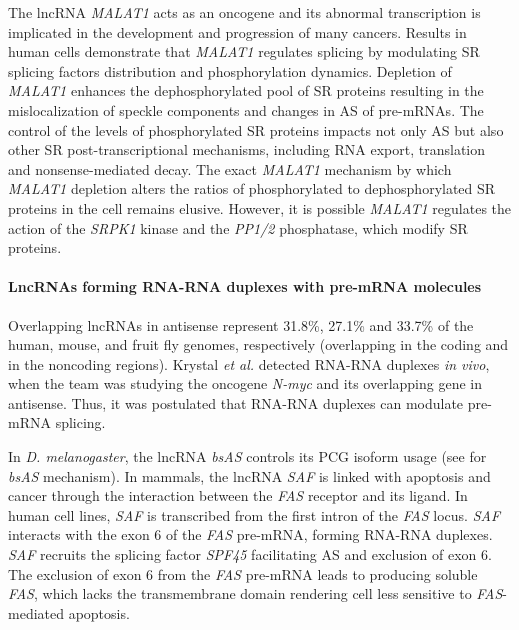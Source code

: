 The lncRNA \textit{MALAT1} acts as an oncogene and its abnormal transcription is implicated in the development and progression of many cancers.\autocite{wang_2016_malat1,malakar_2017_malat1} Results in human cells demonstrate that \textit{MALAT1} regulates splicing by modulating SR splicing factors distribution and phosphorylation dynamics\autocite{tripathi_2010_malat1}. Depletion of \textit{MALAT1} enhances the dephosphorylated pool of SR proteins resulting in the mislocalization of speckle components and changes in AS of pre-mRNAs. The control of the levels of phosphorylated SR proteins impacts not only AS but also other SR post-transcriptional mechanisms, including RNA export, translation and nonsense-mediated decay.\autocite{romero_2018_splicing} The exact \textit{MALAT1} mechanism by which \textit{MALAT1} depletion alters the ratios of phosphorylated to dephosphorylated SR proteins in the cell remains elusive. However, it is possible \textit{MALAT1} regulates the action of the \textit{SRPK1} kinase and the \textit{PP1/2} phosphatase, which modify SR proteins.\autocite{romero_2018_splicing}

\paragraph{LncRNAs forming RNA-RNA duplexes with pre-mRNA molecules}
\label{paragraph:lncRNA_duplexes}

Overlapping lncRNAs in antisense represent 31.8\%, 27.1\% and 33.7\% of the human, mouse, and fruit fly genomes\autocite{frankish_2021_gencode,thurmond_2019_flybase}, respectively (overlapping in the coding and in the noncoding regions). Krystal \textit{et al.} detected RNA-RNA duplexes \textit{in vivo}, when the team was studying the oncogene \textit{N-myc} and its overlapping gene in antisense.\autocite{krystal_1990_rna-rna_duplex} Thus, it was postulated that RNA-RNA duplexes can modulate pre-mRNA splicing.  

In \textit{D. melanogaster}, the lncRNA \textit{bsAS} controls its PCG isoform usage\autocite{perez_blister} (see  for \textit{bsAS} mechanism). In mammals, the lncRNA \textit{SAF} is linked with apoptosis and cancer through the interaction between the \textit{FAS} receptor and its ligand.\autocite{} In human cell lines, \textit{SAF} is transcribed from the first intron of the \textit{FAS} locus. \textit{SAF} interacts with the exon 6 of the \textit{FAS} pre-mRNA, forming RNA-RNA duplexes. \textit{SAF} recruits the splicing factor \textit{SPF45} facilitating AS and exclusion of exon 6. The exclusion of exon 6 from the \textit{FAS} pre-mRNA leads to producing soluble \textit{FAS}, which lacks the transmembrane domain rendering cell less sensitive to \textit{FAS}-mediated apoptosis.\autocite{villamizar_2016_saf,villamizar_2016_fas}

